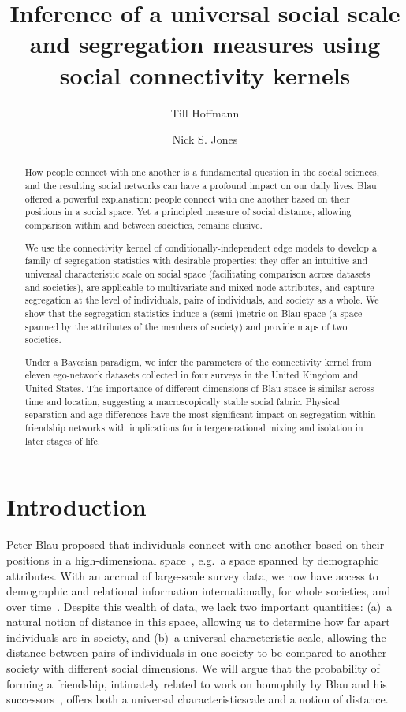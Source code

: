 \documentclass{scrartcl}
\title{Inference of a universal social scale and segregation measures using social connectivity kernels}
\author{Till Hoffmann}
\author{Nick S. Jones}
\affil{Department of Mathematics, Imperial College London}
\date{}
\begin{document}
\maketitle

\begin{abstract} %
    How people connect with one another is a fundamental question in the social sciences, and the resulting social networks can have a profound impact on our daily lives. Blau offered a powerful explanation: people connect with one another based on their positions in a social space. Yet a principled measure of social distance, allowing comparison within and between societies, remains elusive.

    We use the connectivity kernel of conditionally-independent edge models to develop a family of segregation statistics with desirable properties: they offer an intuitive and universal characteristic scale on social space (facilitating comparison across datasets and societies), are applicable to multivariate and mixed node attributes, and capture segregation at the level of individuals, pairs of individuals, and society as a whole. We show that the segregation statistics induce a (semi-)metric on Blau space (a space spanned by the attributes of the members of society) and provide maps of two societies.

    Under a Bayesian paradigm, we infer the parameters of the connectivity kernel from eleven ego-network datasets collected in four surveys in the United Kingdom and United States. The importance of different dimensions of Blau space is similar across time and location, suggesting a macroscopically stable social fabric. Physical separation and age differences have the most significant impact on segregation within friendship networks with implications for intergenerational mixing and isolation in later stages of life.
\end{abstract}

\section{Introduction\label{sec:introduction}}

Peter Blau proposed that individuals connect with one another based on their positions in a high-dimensional space~\cite{Blau1977}, e.g.\ a space spanned by demographic attributes. With an accrual of large-scale survey data, we now have access to demographic and relational information internationally, for whole societies, and over time~\cite{McPherson2001,McPherson2006,Mossong2008}. Despite this wealth of data, we lack two important quantities: (a)~a natural notion of distance in this space, allowing us to determine how far apart individuals are in society, and (b)~a universal characteristic scale, allowing the distance between pairs of individuals in one society to be compared to another society with different social dimensions. We will argue that the probability of forming a friendship, intimately related to work on homophily by Blau and his successors~\cite{McPherson2001}, offers both a universal characteristicscale and a notion of distance.
\end{document}
